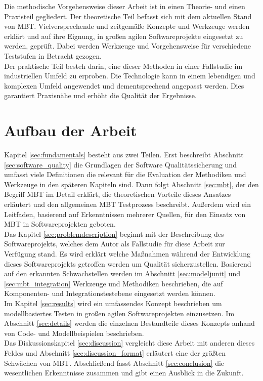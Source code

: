 Die methodische Vorgehensweise dieser Arbeit ist in einen Theorie- und einen Praxisteil gegliedert. Der theoretische Teil befasst sich mit dem aktuellen Stand von \Gls{MBT}. Vielversprechende und zeitgemäße Konzepte und Werkzeuge werden erklärt und auf ihre Eignung, in großen agilen Softwareprojekte eingesetzt zu werden, geprüft. Dabei werden Werkzeuge und Vorgehensweise für verschiedene Teststufen in Betracht gezogen.\\
Der praktische Teil besteh darin, eine dieser Methoden in einer Fallstudie im industriellen Umfeld zu erproben. Die Technologie kann in einem lebendigen und komplexen Umfeld angewendet und dementsprechend angepasst werden. Dies garantiert Praxisnähe und erhöht die Qualität der Ergebnisse.

\section{Aufbau der Arbeit}
Kapitel \ref{sec:fundamentals}  besteht aus zwei Teilen. Erst beschreibt Abschnitt \ref{sec:software_quality} die Grundlagen der Software Qualitätssicherung und umfasst viele Definitionen die relevant für die Evaluation der Methodiken und Werkzeuge in den späteren Kapiteln sind. Dann folgt Abschnitt \ref{sec:mbt}, der den Begriff \Gls{MBT} im Detail erklärt, die theoretischen Vorteile dieses Ansatzes erläutert und den allgemeinen \Gls{MBT} Testprozess beschreibt. Außerdem wird ein Leitfaden, basierend auf Erkenntnissen mehrerer Quellen, für den Einsatz von \Gls{MBT} in Softwareprojekten geboten.\\

Das Kapitel \ref{sec:problemdescription}  beginnt mit der Beschreibung des Softwareprojekts, welches dem Autor als Fallstudie für diese Arbeit zur Verfügung stand. Es wird erklärt welche Maßnahmen während der Entwicklung dieses Softwareprojekts getroffen werden um Qualität sicherzustellen. Basierend auf den erkannten Schwachstellen werden im Abschnitt \ref{sec:modeljunit} und \ref{sec:mbt_integration} Werkzeuge und Methodiken beschrieben, die auf Komponenten- und Integrationstestebene eingesetzt werden können.\\

Im Kapitel \ref{sec:results} wird ein umfassendes Konzept beschrieben um modellbasiertes Testen in großen agilen Softwareprojekten einzusetzen. Im Abschnitt \ref{sec:details} werden die einzelnen Bestandteile dieses Konzepts anhand von Code- und Modellbeispielen beschrieben.\\

Das Diskussionskapitel \ref{sec:discussion} vergleicht diese Arbeit mit anderen dieses Feldes und Abschnitt \ref{sec:discussion_format} erläutert eine der größten Schwächen von \Gls{MBT}. Abschließend fasst Abschnitt \ref{sec:conclusion} die wesentlichen Erkenntnisse zusammen und gibt einen Ausblick in die Zukunft.